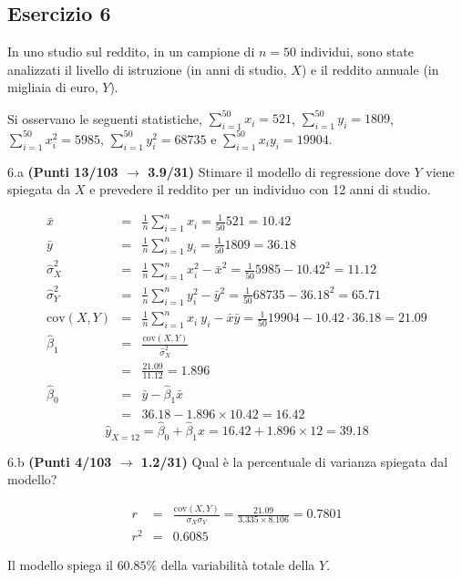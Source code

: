 \documentclass[
  11pt,
]{book}
\theoremstyle{mytheoremstyle}
\theoremstyle{mydefstyle}
\newenvironment{sol}
  {
  \begin{tcolorbox}[enhanced,breakable,arc=0.1mm,boxrule=1pt,colback=white,colframe=iblue,
  title=\bf \fontfamily{lmss}\selectfont \hspace{.5 cm} Soluzione,drop fuzzy shadow]

}{
\end{tcolorbox}
  }
\begin{document}
\subsection{Esercizio 6}\label{esercizio-6-28}

In uno studio sul reddito, in un campione di \(n=50\) individui, sono state analizzati il livello di istruzione (in anni di studio, \(X\)) e il reddito annuale (in migliaia di euro, \(Y\)).

Si osservano le seguenti statistiche, \(\sum_{i=1}^{50}x_i=521\), \(\sum_{i=1}^{50}y_i=1809\),
\(\sum_{i=1}^{50}x_i^2=5985\), \(\sum_{i=1}^{50}y_i^2=68735\) e \(\sum_{i=1}^{50}x_iy_i=19904\).

6.a \textbf{(Punti 13/103 \(\rightarrow\) 3.9/31)} Stimare il modello di regressione dove \(Y\) viene spiegata da \(X\) e prevedere il reddito per un individuo con 12 anni di studio.

\begin{sol}
\begin{eqnarray*}
           \bar x &=&\frac 1 n\sum_{i=1}^n x_i = \frac {1}{ 50 }  521 =  10.42 \\
           \bar y &=&\frac 1 n\sum_{i=1}^n y_i = \frac {1}{ 50 }  1809 =  36.18 \\
           \hat\sigma_X^2&=&\frac 1 n\sum_{i=1}^n x_i^2-\bar x^2=\frac {1}{ 50 }  5985  - 10.42 ^2= 11.12 \\
           \hat\sigma_Y^2&=&\frac 1 n\sum_{i=1}^n y_i^2-\bar y^2=\frac {1}{ 50 }  68735  - 36.18 ^2= 65.71 \\
           \text{cov}(X,Y)&=&\frac 1 n\sum_{i=1}^n x_i~y_i-\bar x\bar y=\frac {1}{ 50 }  19904 - 10.42 \cdot 36.18 = 21.09 \\
           \hat\beta_1 &=& \frac{\text{cov}(X,Y)}{\hat\sigma_X^2} \\
                    &=& \frac{ 21.09 }{ 11.12 }  =  1.896 \\
           \hat\beta_0 &=& \bar y - \hat\beta_1 \bar x\\
                    &=&  36.18 - 1.896 \times  10.42 = 16.42 
         \end{eqnarray*}\[\hat y_{X= 12 }=\hat\beta_0+\hat\beta_1 x= 16.42 + 1.896 \times 12 = 39.18 \]

\end{sol}

6.b \textbf{(Punti 4/103 \(\rightarrow\) 1.2/31)} Qual è la percentuale di varianza spiegata dal modello?

\begin{sol}
\begin{eqnarray*}
r&=&\frac{\text{cov}(X,Y)}{\sigma_X\sigma_Y}=\frac{ 21.09 }{ 3.335 \times 8.106 }= 0.7801 \\ 
r^2&=& 0.6085\end{eqnarray*}

Il modello spiega il \(60.85\%\) della variabilità totale della \(Y\).

\end{sol}
\end{document}
